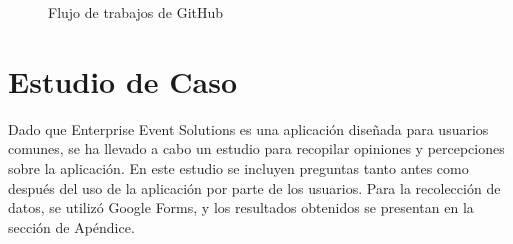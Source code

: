 \begin{figure}[h!]
    \centering
    \hfill
    \caption{Flujo de trabajos de GitHub}
    \label{fig:tripleta}
\end{figure}

\section{Estudio de Caso}
Dado que Enterprise Event Solutions es una aplicación diseñada para usuarios comunes, se ha llevado a cabo un estudio para recopilar opiniones y percepciones
 sobre la aplicación. En este estudio se incluyen preguntas tanto antes como después del uso de la aplicación por parte de los usuarios. Para la recolección de datos, 
 se utilizó Google Forms, y los resultados obtenidos se presentan en la sección de Apéndice.


